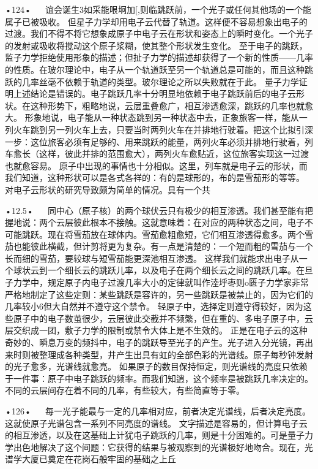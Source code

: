 •124•
  
谊会诞生3如采能哏坰加[,则临跳跃前，一个光子或任何其他场的一个能属子已被吸收。
但星子力学却用电子云代替了轨道。这样便不容易想象出电子的过渡。我们不得不将它想象成原子中电子云在形状和姿态上的瞬时变化。一个光子的发射或吸收将搅动这个原子浆糊，使其整个形状发生变化。
至于电子的跳跃，监子力学拒绝使用形象的描述；但扯子力学的描述却获得了一个新的性质——几率的性质。在玻尔理论中，电子从一个轨道跃至另一个轨道总是可能的，而且这种跳跃的几率丝毫不依赖于轨道的类型。玻尔理论之所以失败就在于此。
量子力学证明上述结论是错误的。电子跳跃几率十分明显地依赖于电子跳跃前后的电子云形状。在这种形势下，粗略地说，云层重叠愈广，相互渗透愈深，跳跃的几率也就愈大。
形象地说，电子能从一种状态跳到另一种状态中去，正象旅客一样，能从一列火车跳到另一列火车上去，只要当时两列火车在并排地行驶着。把这个比拟引深一步：这位旅客必须有足够的、用来跳跃的能量，两列火车必须并排地行驶着，列车愈长（这样，彼此并排的范围愈大），两列火车愈贴近，这位旅客实现这一过渡也就愈容易。
原子中出现的事情也十分相似。这里，列车就是电子云的形状，而我们知道，这种形状可以是各式各祥的：有的是球形的，布的是雪茄形的等等。
对电子云形状的研究导致颇为简单的情况。具有一个共

•12.5•
  
同中心（原子核）的两个球伏云只有极少的相互渗透。我们甚至能有把握地说：两个云层彼此根本不接触。这就意味着：在对应的两种状态之间，电子不可能跳跃。现在将雪茄放在球体内。雪茄愈粗愈短，它们相互渗透得愈多。两个雪茄也能彼此横截，但计剪将更为复杂。有一点是清楚的：一个短而粗的雪茄与一个长而细的雪茄，要较球与短雪茄能更深池相互渗透。
这样我们就能求出电子从一个球状云到一个细长云的跳跃儿率，以及电子在两个细长云之间的跳跃几率。在旦子力学中，规定原子内电子过渡几率大小的定律就叫作淕垀枣则o匮子力学家非常严格地制定了这些定则：某些跳跃是容许的，另一些跳跃是被禁止的，因为它们的几率较小6但大自然并不遵守这个禁令。
轻原子中，选择定则遵守得较好，因为这些原子中的电子数茧很少，云层彼此交截并不频繁，但在重的、多电子原子中，云层交织成一团，敷子力学的限制或禁令大体上是不生效的。
正是在电子云的这种奇妙的、瞬息万变的频抖中，电子的跳跃导至光子的产生。光子进入分光镜，再出来时则被整理成各种类型，井产生出具有虹的全部色彩的光谱线。原子每秒钟发射的光子愈多，光谱线就愈亮。
如果原子的数目保持恒定，则光谱线的亮度只依赖于一件事：原子中电子跳跃的频率。而我们知逍，这个频率是被跳跃几率决定的。不同的云层间存在着不同的几率，有些较大，有些简直等于零。

•126•
  
每一光子能最与一定的几率相对应，前者决定光谱线，后者决定亮度。这就使原子光谱包含一系列不同亮度的谱线。
文字描述是容易的，但计算电子云的相互渗透，以及在这基础上计犹屯子跳跃的几率，则是十分困难的。可是量子力学出色地解决了这个间题：它获得的结果与被观察到的光谱极好地吻合。现在，光谱学大厦已奠定在花岗石般牢固的基础之上丘

